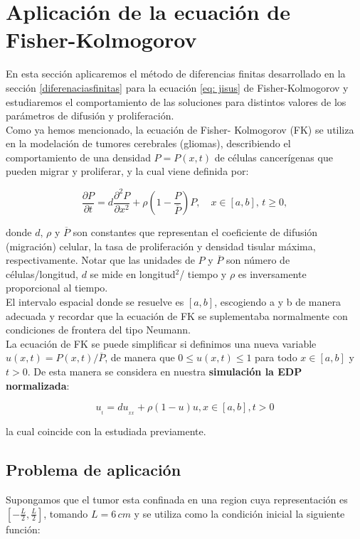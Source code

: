 \section{Aplicación de la ecuación de Fisher-Kolmogorov}

En esta sección aplicaremos el método de diferencias finitas desarrollado en la sección \ref{diferenaciasfinitas} para la ecuación \eqref{eq: jisus} de Fisher-Kolmogorov  y estudiaremos el comportamiento de las soluciones para distintos valores de los parámetros de difusión y proliferación.\\

Como ya hemos mencionado, la ecuación de Fisher- Kolmogorov (FK) se utiliza en la modelación de tumores cerebrales (gliomas), describiendo el comportamiento de una densidad $P=P(x,t)$ de células cancerígenas que pueden migrar y proliferar, y la cual viene definida por: 

$$\dfrac{\partial P}{\partial t}=d\dfrac{\partial^{2}P}{\partial x^{2}}+\rho(1-\dfrac{P}{\overline{P}})P,\quad x\in[a,b],\,t\geq 0,$$

donde $d,\,\rho$ y $\overline{P}$ son constantes que representan el coeficiente de difusión (migración) celular, la tasa de proliferación y densidad tisular máxima, respectivamente. Notar que las unidades de $P$ y $\overline{P}$ son número de células/longitud, $d$ se mide en longitud$^{2}$/ tiempo y $\rho$ es inversamente proporcional al tiempo. \\

El intervalo espacial donde se resuelve es $[a,b]$, escogiendo a y b de manera adecuada y recordar que la ecuación de FK se suplementaba normalmente con condiciones de frontera del tipo Neumann.\\

La ecuación de FK se puede simplificar si definimos una nueva variable $u(x,t)=P(x,t)/\overline{P}$, de manera que $0\leq u(x,t)\leq 1$ para todo $x\in[a,b]$ y $t>0$. De esta manera se considera en nuestra \textbf{simulación la EDP normalizada}:

$$u_{_{t}}=du_{_{xx}}+\rho(1-u)u, x\in[a,b],t>0$$

la cual coincide con la estudiada previamente.

\subsection{Problema de aplicación} \label{problemasuelto}
Supongamos que el tumor esta confinada en una region cuya representación es $[-\frac{L}{2},\frac{L}{2}]$, tomando $L=6\,cm$ y se utiliza como la condición inicial la siguiente función:

